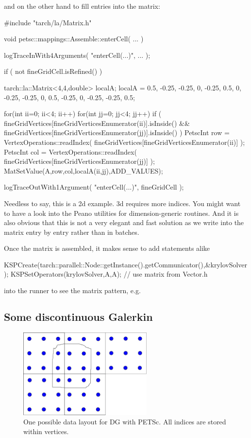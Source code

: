 \noindent
and on the other hand to fill entries into the matrix:
\begin{code}
#include "tarch/la/Matrix.h"


void petsc::mappings::Assemble::enterCell(
  ...
) {
 logTraceInWith4Arguments( "enterCell(...)", ... );

 if ( not fineGridCell.isRefined() ) {
  tarch::la::Matrix<4,4,double> localA;
  localA = 0.5,  -0.25, -0.25, 0,
           -0.25, 0.5,  0,    -0.25,
           -0.25, 0,    0.5,  -0.25,
           0,    -0.25, -0.25, 0.5;

  for(int ii=0; ii<4; ii++)
  for(int jj=0; jj<4; jj++) {
   if (
    fineGridVertices[fineGridVerticesEnumerator(ii)].isInside()
    &&
    fineGridVertices[fineGridVerticesEnumerator(jj)].isInside()
   ) {
    PetscInt row = VertexOperations::readIndex( fineGridVertices[fineGridVerticesEnumerator(ii)] );
    PetscInt col = VertexOperations::readIndex( fineGridVertices[fineGridVerticesEnumerator(jj)] );
    MatSetValue(A,row,col,localA(ii,jj),ADD_VALUES);
   }
  }
 }

 logTraceOutWith1Argument( "enterCell(...)", fineGridCell );
}
\end{code}

\noindent
Needless to say, this is a 2d example. 3d requires more indices. You might want
to have a look into the Peano utilities for dimension-generic routines. And it
is also obvious that this is not a very elegant and fast solution as we write
into the matrix entry by entry rather than in batches.

Once the matrix is assembled, it makes sense to add statements alike
\begin{code}
  KSPCreate(tarch::parallel::Node::getInstance().getCommunicator(),&krylovSolver);
  KSPSetOperators(krylovSolver,A,A); // use matrix from Vector.h
\end{code}

\noindent
into the runner to see the matrix pattern, e.g.



\subsection{Some discontinuous Galerkin}


\begin{figure}
  \begin{center}
    \includegraphics[width=0.6\textwidth]{43_dg/dg-data-layout.pdf}
  \end{center}
  \caption{One possible data layout for DG with PETSc. All indices are stored
  within vertices.}
  \label{figure:43_petsc:data-layout}
\end{figure}

